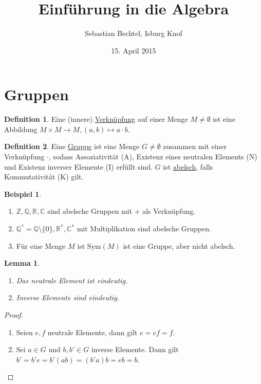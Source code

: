 \documentclass[fleqn, 12pt]{scrartcl}
\newtheorem{lemma}{Lemma}
\theoremstyle{definition}
\newtheorem*{defn}{Definition}
\newtheorem{ex}{Beispiel}
\theoremstyle{remark}
\newcommand{\sym}{\text{Sym}}
\begin{document}
\author{Sebastian Bechtel, Isburg Knof}
\title{Einführung in die Algebra}
\date{15. April 2015}

\maketitle %

\section{Gruppen}

\begin{defn}
    Eine (innere) \underline{Verknüpfung} auf einer Menge \(M\neq \emptyset\) ist eine Abbildung \(M\times M\to M, (a,b)\mapsto a\cdot b\).
\end{defn}

\begin{defn}
    Eine \underline{Gruppe} ist eine Menge \(G\neq \emptyset\) zusammen mit einer Verknüpfung \(\cdot\), sodass Assoziativität (A), Existenz eines neutralen Elements (N) und Existenz inverser Elemente (I) erfüllt sind. \(G\) ist \underline{abelsch}, falls Kommutativität (K) gilt.
\end{defn}

\begin{ex}
    \begin{enumerate}
        \item \(\mathbb{Z}, \mathbb{Q}, \mathbb{R}, \mathbb{C}\) sind abelsche Gruppen mit \(+\) als Verknüpfung.
        \item \(\mathbb{Q}^*=\mathbb{Q}\setminus \{0\}, \mathbb{R}^*, \mathbb{C}^*\) mit Multiplikation sind abelsche Gruppen.
        \item Für eine Menge \(M\) ist \(\sym(M)\) ist eine Gruppe, aber nicht abelsch.
    \end{enumerate}
\end{ex}

\begin{lemma}
    \begin{enumerate}
        \item Das neutrale Element ist eindeutig.
        \item Inverse Elemente sind eindeutig.
    \end{enumerate}
\end{lemma}

\begin{proof}
    \begin{enumerate}
        \item Seien \(e,f\) neutrale Elemente, dann gilt \(e=ef=f\).
        \item Sei \(a\in G\) und \(b,b'\in G\) inverse Elemente. Dann gilt \(b'=b'e=b'(ab)=(b'a)b=eb=b\). 
    \end{enumerate}
\end{proof}
\end{document}
